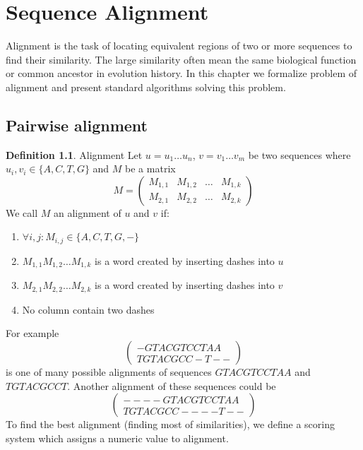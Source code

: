 \chapter{Sequence Alignment}

\label{kap:alignment} %

Alignment is the task of locating equivalent regions of two or more sequences to find their similarity.
The large similarity often mean the same biological function or common ancestor in evolution history.
In this chapter we formalize problem of alignment and present standard algorithms
solving this problem.

\section{Pairwise alignment}

\theoremstyle{definition}
\newtheorem{definition}{Definition}[section]
\theoremstyle{definition}
\begin{definition}{Alignment}
Let $u=u_1 \dots u_n$, $v=v_1 \dots v_m$ be two sequences where $u_i,v_i\in \{A, C, T, G\}$ and $M$ be a matrix
$$M=
\begin{pmatrix}
  M_{1,1} & M_{1,2} & \dots & M_{1,k} \\
  M_{2,1} & M_{2,2} & \dots & M_{2,k}
\end{pmatrix}$$
We call $M$ an alignment of $u$ and $v$ if:
\begin{enumerate}
\item $\forall i,j : M_{i,j}\in \{A,C,T,G,-\}$
\item $M_{1,1} M_{1,2} \dots M_{1,k}$ is a word created by inserting dashes into $u$
\item $M_{2,1} M_{2,2} \dots M_{2,k}$ is a word created by inserting dashes into $v$
\item No column contain two dashes
\end{enumerate}
\end{definition}

For example 
$$
\begin{pmatrix}
   -GTACGTCCTAA \\
   TGTACGCC-T--
\end{pmatrix}$$
is one  of many possible alignments of sequences $GTACGTCCTAA$ and $TGTACGCCT$.
Another alignment of these sequences could be 
$$\begin{pmatrix}
   ----GTACGTCCTAA \\
   TGTACGCC----T--
\end{pmatrix}$$
To find the best alignment (finding most of similarities), we define a scoring system which assigns a numeric value to alignment.

